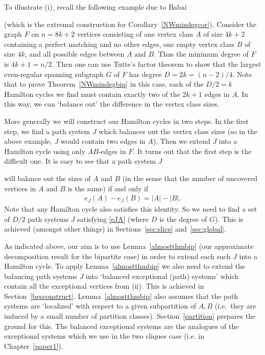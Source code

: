 \documentclass{memo-l}
\def\COMMENT#1{}
\numberwithin{section}{chapter}
\numberwithin{equation}{section}
\numberwithin{firstthm}{section}
\numberwithin{figure}{section}
\begin{document}
{To illustrate (i), recall the following example due to Babai%
\COMMENT{osthus added Babai} 
(which is the extremal construction for Corollary~\ref{NWmindegcor}).
Consider the graph $F$ on $n = 8k+2$ vertices consisting of one vertex class $A$ of size $4k+2$ containing
a perfect matching and no other edges, one empty
vertex class $B$ of size $4k$,  and all possible edges between $A$ and $B$.
Thus the minimum degree of $F$ is $4k+1=n/2$. 
Then one can use Tutte's factor theorem to show that the largest even-regular spanning subgraph $G$ of $F$ has degree $D = 2k=(n-2)/4$.
Note that to prove Theorem~\ref{NWmindegbip} in this case, each of the $D/2=k$ Hamilton cycles we find must contain exactly two of the $2k+1$ edges in $A$.
In this way, we can `balance out' the difference in the vertex class sizes.

More generally we will construct our Hamilton cycles in two steps.
In the first step, we find a path system $J$ which balances out the vertex class sizes (so in the above example, $J$ would contain two edges in $A$).
Then we extend $J$ into a Hamilton cycle using only $AB$-edges in $F$.
It turns out that the first step is the difficult one.
It is easy to see that a path system $J$%
\COMMENT{Andy: added $J$}
will balance out the sizes of $A$ and $B$ (in the sense that the number of uncovered vertices in $A$ and $B$ is the same) if 
and only if
\begin{align}
e_J(A)- e_J(B) = |A| - |B|. \label{eJA}
\end{align}
Note that any Hamilton cycle also satisfies this identity.
So we need to find a set of $D/2$ path systems $J$ satisfying \eqref{eJA} (where $D$ is the degree of $G$).
This is achieved (amongst other things) in Sections~\ref{sec:slice} and~\ref{sec:global}.

As indicated above, our aim is to use Lemma~\ref{almostthmbip} (our approximate decomposition result for the bipartite case) in order to extend each such $J$ into a Hamilton cycle.
To apply Lemma~\ref{almostthmbip} we also need to extend the balancing path systems $J$ into `balanced exceptional (path)
systems' which contain all the exceptional vertices from (ii).
This is achieved in Section~\ref{besconstruct}.
Lemma~\ref{almostthmbip} also assumes that the path systems are `localized' with respect to a given subpartition of $A,B$ (i.e.~they are induced by a small number of partition classes).
Section~\ref{partition} prepares the ground for this. The balanced exceptional systems are the analogues of the exceptional systems which we use in the two cliques case (i.e. in Chapter~\ref{paper1}).

}
\end{document}
